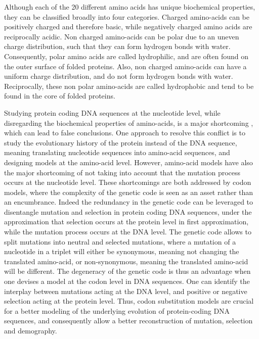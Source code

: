 Although each of the 20 different amino acids has unique biochemical properties, they can be classified broadly into four categories.
Charged amino-acids can be positively charged and therefore basic, while negatively charged amino acids are reciprocally acidic.
Non charged amino-acids can be polar due to an uneven charge distribution, such that they can form hydrogen bonds with water.
Consequently, polar amino acids are called hydrophilic, and are often found on the outer surface of folded proteins.
Also, non charged amino-acids can have a uniform charge distribution, and do not form hydrogen bonds with water.
Reciprocally, these non polar amino-acids are called hydrophobic and tend to be found in the core of folded proteins.

Studying protein coding \acrshort{DNA} sequences at the nucleotide level, while disregarding the biochemical properties of amino-acids, is a major shortcoming , which can lead to false conclusions.
One approach to resolve this conflict is to study the evolutionary history of the protein instead of the \acrshort{DNA} sequence, meaning translating nucleotide sequences into amino-acid sequences, and designing models at the amino-acid level.
However, amino-acid models have also the major shortcoming of not taking into account that the mutation process occurs at the nucleotide level.
These shortcomings are both addressed by \gls{codon} models, where the complexity of the genetic code is seen as an asset rather than an encumbrance.
Indeed the redundancy in the genetic code can be leveraged to disentangle mutation and selection in protein coding \acrshort{DNA} sequences, under the approximation that selection occurs at the protein level in first approximation, while the mutation process occurs at the \acrshort{DNA} level.
The genetic code allows to split mutations into \gls{neutral} and selected mutations, where a mutation of a nucleotide in a triplet will either be synonymous, meaning not changing the translated amino-acid, or non-synonymous, meaning the translated amino-acid will be different.
The degeneracy of the genetic code is thus an advantage when one devises a model at the \gls{codon} level in \acrshort{DNA} sequences.
One can identify the interplay between mutations acting at the \acrshort{DNA} level, and positive or negative selection acting at the protein level.
Thus, \gls{codon} \gls{substitution} models are crucial for a better modeling of the underlying evolution of protein-coding \acrshort{DNA} sequences, and consequently allow a better reconstruction of mutation, selection and demography.

